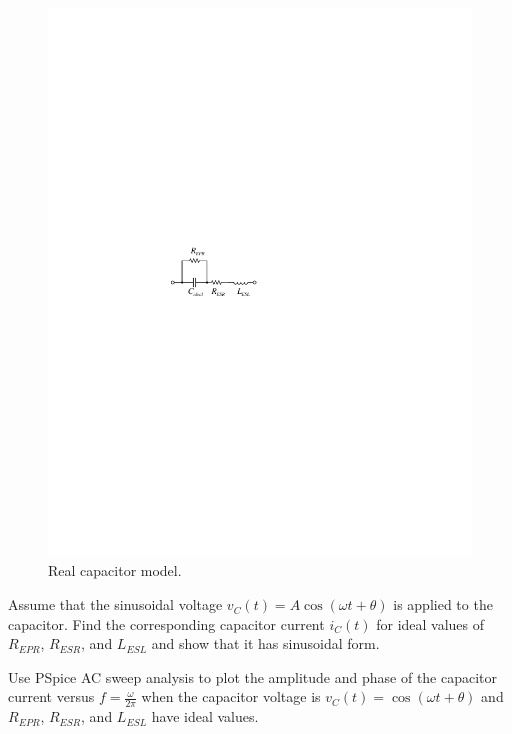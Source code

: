 \documentclass[11pt]{article}
\begin{document}
\begin{question}


\begin{figure}[H]
\centering
\includegraphics[scale=1.5,angle=0]{Fig/cir4.pdf}
\caption{Real capacitor model.} \label{fig:cir4}
\end{figure}

\begin{subquestion}{Assume that the sinusoidal voltage $v_C(t)=A\cos(\omega t+\theta)$ is applied to the capacitor. Find the corresponding capacitor current $i_C(t)$ for ideal values of $R_{EPR}$, $R_{ESR}$, and $L_{ESL}$ and show that it has sinusoidal form.} 
\answer{}
\end{subquestion}

\begin{subquestion}{Use PSpice AC sweep analysis to plot the amplitude and phase of the capacitor current versus $f=\frac{\omega}{2\pi}$ when the capacitor voltage is $v_C(t)=\cos(\omega t+\theta)$ and $R_{EPR}$, $R_{ESR}$, and $L_{ESL}$ have ideal values.} 
\answer{}
\end{subquestion}


\end{question}
\end{document}
